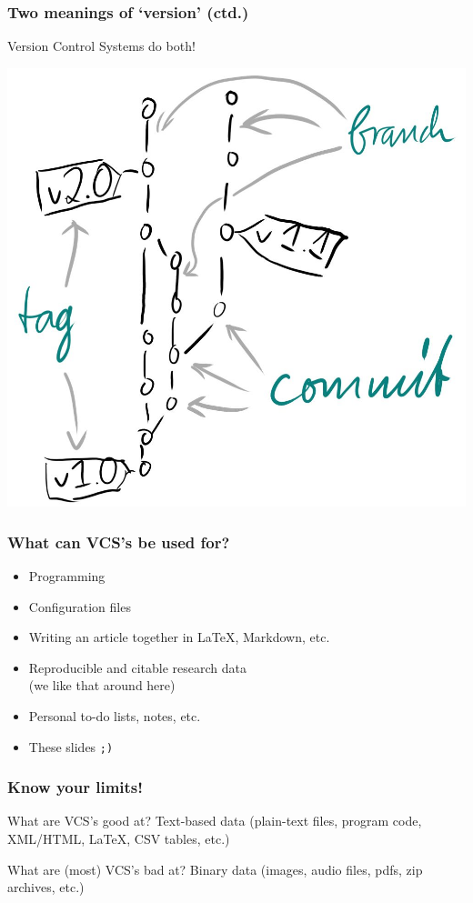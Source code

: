 \documentclass[12pt]{beamer}
\begin{document}
\begin{frame}
  \frametitle{Two meanings of `version' (ctd.)}

  Version Control Systems do both!\\
  \begin{center}
    \includegraphics[width=.5\textwidth]{images/terminology.jpg}
  \end{center}
\end{frame}

\begin{frame}
  \frametitle{What can VCS's be used for?}

  \begin{itemize}
    \item Programming
    \item Configuration files
    \item Writing an article together in \LaTeX, Markdown, etc.
    \item \alert{Reproducible and citable research data}\\
      (we like that around here)
    \item Personal to-do lists, notes, etc.
    \item These slides \texttt{;)}
  \end{itemize}
\end{frame}

\begin{frame}
  \frametitle{Know your limits!}

  \begin{block}{What are VCS's good at?}
    Text-based data
    (plain-text files, program code, XML/HTML, \LaTeX, CSV tables, etc.)
  \end{block}

  \begin{block}{What are (most) VCS's bad at?}
    Binary data
    (images, audio files, pdfs, zip archives, etc.)
  \end{block}
\end{frame}
\end{document}
